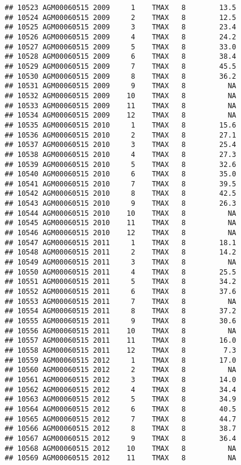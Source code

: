 \documentclass{article}\usepackage[]{graphicx}\usepackage[]{color}
\makeatletter
\newenvironment{kframe}{%
 \def\at@end@of@kframe{}%
 \ifinner\ifhmode%
  \def\at@end@of@kframe{\end{minipage}}%
  \begin{minipage}{\columnwidth}%
 \fi\fi%
 \def\FrameCommand##1{\hskip\@totalleftmargin \hskip-\fboxsep
 \colorbox{shadecolor}{##1}\hskip-\fboxsep
     \hskip-\linewidth \hskip-\@totalleftmargin \hskip\columnwidth}%
 \MakeFramed {\advance\hsize-\width
   \@totalleftmargin\z@ \linewidth\hsize
   \@setminipage}}%
 {\par\unskip\endMakeFramed%
 \at@end@of@kframe}
\newenvironment{knitrout}{}{} %
\makeatother
\begin{document}
\begin{knitrout}
\begin{kframe}
\begin{verbatim}
## 10523 AGM00060515 2009     1    TMAX   8        13.5
## 10524 AGM00060515 2009     2    TMAX   8        12.5
## 10525 AGM00060515 2009     3    TMAX   8        23.4
## 10526 AGM00060515 2009     4    TMAX   8        24.2
## 10527 AGM00060515 2009     5    TMAX   8        33.0
## 10528 AGM00060515 2009     6    TMAX   8        38.4
## 10529 AGM00060515 2009     7    TMAX   8        45.5
## 10530 AGM00060515 2009     8    TMAX   8        36.2
## 10531 AGM00060515 2009     9    TMAX   8          NA
## 10532 AGM00060515 2009    10    TMAX   8          NA
## 10533 AGM00060515 2009    11    TMAX   8          NA
## 10534 AGM00060515 2009    12    TMAX   8          NA
## 10535 AGM00060515 2010     1    TMAX   8        15.6
## 10536 AGM00060515 2010     2    TMAX   8        27.1
## 10537 AGM00060515 2010     3    TMAX   8        25.4
## 10538 AGM00060515 2010     4    TMAX   8        27.3
## 10539 AGM00060515 2010     5    TMAX   8        32.6
## 10540 AGM00060515 2010     6    TMAX   8        35.0
## 10541 AGM00060515 2010     7    TMAX   8        39.5
## 10542 AGM00060515 2010     8    TMAX   8        42.5
## 10543 AGM00060515 2010     9    TMAX   8        26.3
## 10544 AGM00060515 2010    10    TMAX   8          NA
## 10545 AGM00060515 2010    11    TMAX   8          NA
## 10546 AGM00060515 2010    12    TMAX   8          NA
## 10547 AGM00060515 2011     1    TMAX   8        18.1
## 10548 AGM00060515 2011     2    TMAX   8        14.2
## 10549 AGM00060515 2011     3    TMAX   8          NA
## 10550 AGM00060515 2011     4    TMAX   8        25.5
## 10551 AGM00060515 2011     5    TMAX   8        34.2
## 10552 AGM00060515 2011     6    TMAX   8        37.6
## 10553 AGM00060515 2011     7    TMAX   8          NA
## 10554 AGM00060515 2011     8    TMAX   8        37.2
## 10555 AGM00060515 2011     9    TMAX   8        30.6
## 10556 AGM00060515 2011    10    TMAX   8          NA
## 10557 AGM00060515 2011    11    TMAX   8        16.0
## 10558 AGM00060515 2011    12    TMAX   8         7.3
## 10559 AGM00060515 2012     1    TMAX   8        17.0
## 10560 AGM00060515 2012     2    TMAX   8          NA
## 10561 AGM00060515 2012     3    TMAX   8        14.0
## 10562 AGM00060515 2012     4    TMAX   8        34.4
## 10563 AGM00060515 2012     5    TMAX   8        34.9
## 10564 AGM00060515 2012     6    TMAX   8        40.5
## 10565 AGM00060515 2012     7    TMAX   8        44.7
## 10566 AGM00060515 2012     8    TMAX   8        38.7
## 10567 AGM00060515 2012     9    TMAX   8        36.4
## 10568 AGM00060515 2012    10    TMAX   8          NA
## 10569 AGM00060515 2012    11    TMAX   8          NA

\end{verbatim}
\end{kframe}
\end{knitrout}
\end{document}
